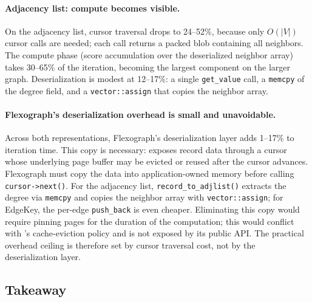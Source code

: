 \paragraph{Adjacency list: compute becomes visible.}
On the adjacency list, cursor traversal drops to 24--52\%, because only $O(|V|)$ cursor calls are needed; each call returns a packed blob containing all neighbors.
The compute phase (score accumulation over the deserialized neighbor array) takes 30--65\% of the iteration, becoming the largest component on the larger graph.
Deserialization is modest at 12--17\%: a single \texttt{get\_value} call, a \texttt{memcpy} of the degree field, and a \texttt{vector::assign} that copies the neighbor array.

\paragraph{Flexograph's deserialization overhead is small and unavoidable.}
Across both representations, Flexograph's deserialization layer adds 1--17\% to iteration time.
This copy is necessary: \wt{} exposes record data through a cursor whose underlying page buffer may be evicted or reused after the cursor advances.
Flexograph must copy the data into application-owned memory before calling \texttt{cursor->next()}.
For the adjacency list, \texttt{record\_to\_adjlist()} extracts the degree via \texttt{memcpy} and copies the neighbor array with \texttt{vector::assign}; for EdgeKey, the per-edge \texttt{push\_back} is even cheaper.
Eliminating this copy would require pinning \wt{} pages for the duration of the computation; this would conflict with \wt{}'s cache-eviction policy and is not exposed by its public API.
The practical overhead ceiling is therefore set by cursor traversal cost, not by the deserialization layer.

\subsection{Takeaway}

